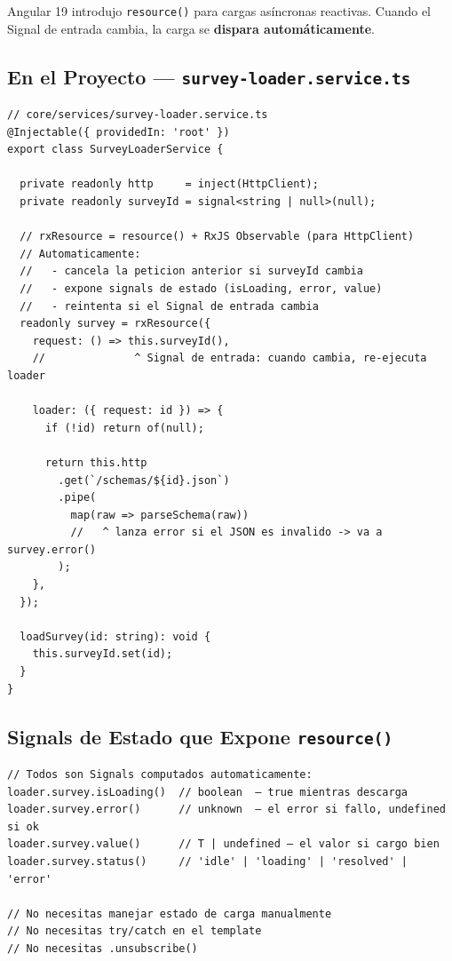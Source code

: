 \documentclass[12pt, a4paper]{article}
\begin{document}
Angular 19 introdujo \texttt{resource()} para cargas asíncronas reactivas.
Cuando el Signal de entrada cambia, la carga se \textbf{dispara automáticamente}.

\subsection{ En el Proyecto --- \texttt{survey-loader.service.ts}}

\begin{lstlisting}
// core/services/survey-loader.service.ts
@Injectable({ providedIn: 'root' })
export class SurveyLoaderService {

  private readonly http     = inject(HttpClient);
  private readonly surveyId = signal<string | null>(null);

  // rxResource = resource() + RxJS Observable (para HttpClient)
  // Automaticamente:
  //   - cancela la peticion anterior si surveyId cambia
  //   - expone signals de estado (isLoading, error, value)
  //   - reintenta si el Signal de entrada cambia
  readonly survey = rxResource({
    request: () => this.surveyId(),
    //              ^ Signal de entrada: cuando cambia, re-ejecuta loader

    loader: ({ request: id }) => {
      if (!id) return of(null);

      return this.http
        .get(`/schemas/${id}.json`)
        .pipe(
          map(raw => parseSchema(raw))
          //   ^ lanza error si el JSON es invalido -> va a survey.error()
        );
    },
  });

  loadSurvey(id: string): void {
    this.surveyId.set(id);
  }
}
\end{lstlisting}

\subsection{ Signals de Estado que Expone \texttt{resource()}}

\begin{lstlisting}
// Todos son Signals computados automaticamente:
loader.survey.isLoading()  // boolean  — true mientras descarga
loader.survey.error()      // unknown  — el error si fallo, undefined si ok
loader.survey.value()      // T | undefined — el valor si cargo bien
loader.survey.status()     // 'idle' | 'loading' | 'resolved' | 'error'

// No necesitas manejar estado de carga manualmente
// No necesitas try/catch en el template
// No necesitas .unsubscribe()
\end{lstlisting}
\end{document}
